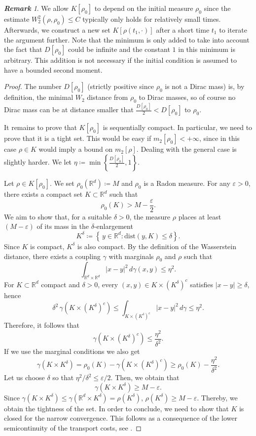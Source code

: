 \documentclass[11pt,a4paper]{article}
\numberwithin{equation}{section}
\theoremstyle{plain}
\theoremstyle{remark}
\newtheorem{remark}[theorem]{\bf Remark}
\begin{document}
\begin{remark}
We allow $K[\rho_0]$ to depend on the initial measure $\rho_0$  since the estimate $W_2^2(\rho,\rho_0)\le C$ typically only holds for relatively small times. Afterwards,  we construct a new set $K[\rho(t_1, \cdot)]$ after a short time $t_1$ to iterate the argument further. Note that the minimum is only added to take into account the fact that $D[\rho_0]$ could be infinite and the constant $1$ in this minimum is arbitrary. This addition is not necessary if the initial condition is assumed to have a bounded second moment. 
\end{remark}

\begin{proof}
The number $D[\rho_0]$ (strictly positive since $\rho_0$ is not a Dirac mass) is, by definition, the minimal $W_2$ distance from $\rho_0$ to Dirac masses, so of course no Dirac mass can be at distance smaller that $\frac{D[\rho_0]}{2}<D[\rho_0]$ to $\rho_0$.

It remains to prove that $K[\rho_0]$ is sequentially compact. In particular, we need to prove that it is a tight set. This would be easy if $m_2[\rho_0]<+\infty$, since in this case $\rho\in K$ would imply a bound on $m_2[\rho]$. Dealing with the general case is slightly harder. We let $\eta\coloneqq \min\left\{\frac{D[\rho_0]}{2},1\right\}$.

 Let $\rho\in K[\rho_0]$. We set $\rho_0(\mathbb{R}^d) \coloneqq M$ and $\rho_0$ is a Radon measure. For any $\varepsilon>0$, there exists a compact set $K \subset \mathbb{R}^d$ such that
$$
  \rho_0(K)  >  M -  \frac{\varepsilon}{2}.
$$
We aim to show that, for a suitable $\delta>0$, the measure $\rho$ places at least $(M-\varepsilon)$ of its mass in the $\delta$-enlargement
$$
  K^\delta  \coloneqq  \left\{\,y \in \mathbb{R}^d : \mathrm{dist}(y,K)\le \delta \right\}.
$$
Since $K$ is compact, $K^\delta$ is also compact.
By the definition of the Wasserstein distance, there exists a coupling $\gamma$ with marginals $\rho_0$ and $\rho$ such that
$$
    \int_{\mathbb{R}^d\times \mathbb{R}^d} |x-y|^2\, d\gamma(x,y) \le \eta^2 .
$$
For $K\subset \mathbb{R}^d$ compact and $\delta>0$, every $(x,y)\in K\times (K^\delta)^c$ satisfies $|x-y|\ge \delta$, hence
$$
\delta^2\,\gamma(K\times (K^\delta)^c)
   \le 
   \int_{K\times (K^\delta)^c} |x-y|^2\, d\gamma
   \le 
   \eta^2.
$$
Therefore, it follows that
$$
\gamma(K\times (K^\delta)^c)\le \frac{\eta^2}{\delta^2}.
$$
If we use the marginal conditions we also get
$$
\gamma(K\times K^\delta)
  =\rho_0(K)- \gamma(K\times (K^\delta)^c)
  \ge \rho_0(K)-\frac{\eta^2}{\delta^2}.
$$
Let us choose $\delta$ so that $\eta^2/\delta^2\le \varepsilon/2$. Then, we obtain that
$$
\gamma(K\times K^\delta)\ge M-\varepsilon.
$$
Since $\gamma(K\times K^\delta)\le \gamma(\mathbb{R}^d\times K^\delta)=\rho(K^\delta)$, $\rho(K^\delta)\ge M-\varepsilon.
$
Thereby, we obtain the tightness of the set. In order to conclude, we need to show that $K$ is closed for the narrow convergence. This follows as a consequence of the lower semicontinuity of the transport costs, see \cite[Proposition 7.4]{Santambrogio15}.
\end{proof}
\end{document}
